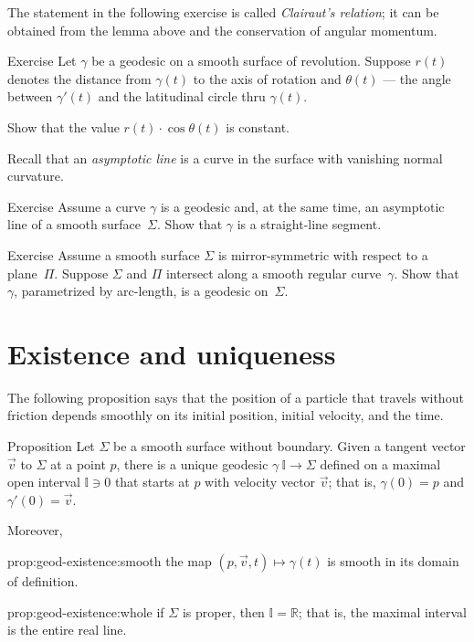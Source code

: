 The statement in the following exercise is called \emph{Clairaut's relation};
it can be obtained from the lemma above and the conservation of angular momentum.

\begin{thm}{Exercise}\label{ex:clairaut}
Let $\gamma$ be a geodesic on a smooth surface of revolution.
Suppose $r(t)$ denotes the distance from $\gamma(t)$ to the axis of rotation
and $\theta(t)$ --- the angle between $\gamma'(t)$ and the latitudinal circle thru $\gamma(t)$. 

Show that the value $r(t)\cdot \cos\theta(t)$ is constant. 
\end{thm}


Recall that an {}\emph{asymptotic line} is a curve in the surface with vanishing normal curvature.

\begin{thm}{Exercise}\label{ex:asymptotic-geodesic}
Assume a curve $\gamma$ is a geodesic and, at the same time, an asymptotic line of a smooth surface~$\Sigma$.
Show that $\gamma$ is a straight-line segment.
\end{thm}


\begin{thm}{Exercise}\label{ex:reflection-geodesic}
Assume a smooth surface $\Sigma$ is mirror-symmetric with respect to a plane~$\Pi$.
Suppose $\Sigma$ and $\Pi$ intersect along a smooth regular curve~$\gamma$.
Show that $\gamma$, parametrized by arc-length, is a geodesic on~$\Sigma$.
\end{thm}



\section{Existence and uniqueness}

The following proposition says that the position of a particle that travels without friction depends smoothly on its initial position, initial velocity, and the time. 



\begin{thm}{Proposition}\label{prop:geod-existence} 
Let $\Sigma$ be a smooth surface without boundary.
Given a tangent vector ${\vec v}$ to $\Sigma$ at a point $p$,
there is a unique geodesic $\gamma\:\mathbb{I}\to \Sigma$ defined on a maximal open interval $\mathbb{I}\ni 0$ that starts at $p$ with velocity vector ${\vec v}$;
that is, $\gamma(0)=p$ and $\gamma'(0)={\vec v}$.

Moreover,
\begin{subthm}{prop:geod-existence:smooth} the map $(p,{\vec v},t)\mapsto \gamma(t)$ is smooth in its domain of definition.
\end{subthm}

\begin{subthm}{prop:geod-existence:whole} if $\Sigma$ is proper, then $\mathbb{I}=\mathbb{R}$; that is, the maximal interval is the entire real line.
\end{subthm}

\end{thm}

